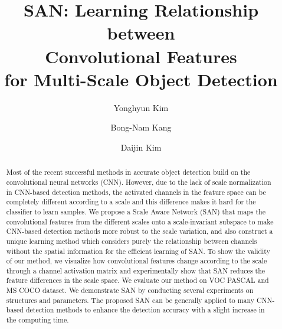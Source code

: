\documentclass[runningheads]{llncs}
\newcommand{\etal}{\textit{et al.}}
\begin{document}
%
\title{SAN: Learning Relationship between \\ Convolutional Features \\for Multi-Scale Object Detection}

%
\author{Yonghyun Kim \and
	Bong-Nam Kang \and
	Daijin Kim}
%
\authorrunning{Y. Kim~\etal}
%

%
\maketitle              %
%
\begin{abstract}
	Most of the recent successful methods in accurate object detection build on the convolutional neural networks (CNN).
	However, due to the lack of scale normalization in CNN-based detection methods, the activated channels in the feature space can be completely different according to a scale and this difference makes it hard for the classifier to learn samples.
	We propose a Scale Aware Network (SAN) that maps the convolutional features from the different scales onto a scale-invariant subspace to make CNN-based detection methods more robust to the scale variation, and also construct a unique learning method which considers purely the relationship between channels without the spatial information for the efficient learning of SAN.
	To show the validity of our method, we visualize how convolutional features change according to the scale through a channel activation matrix and experimentally show that SAN reduces the feature differences in the scale space.
	We evaluate our method on VOC PASCAL and MS COCO dataset.
	We demonstrate SAN by conducting several experiments on structures and parameters.
	The proposed SAN can be generally applied to many CNN-based detection methods to enhance the detection accuracy with a slight increase in the computing time.
\end{abstract}
%
%
%
\end{document}
